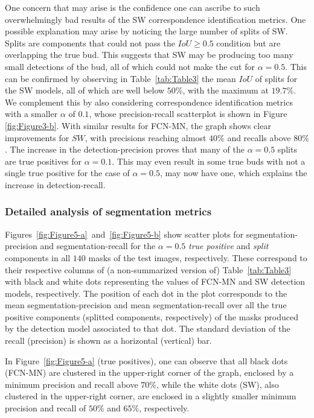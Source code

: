 \documentclass[a4paper,authoryear,review]{elsarticle}
\begin{document}
	One concern that may arise is the confidence one can ascribe to such overwhelmingly bad results of the SW correspondence identification metrics. One possible explanation may arise by noticing the large number of splits of SW. Splits are components that could not pass the $IoU \geq 0.5$ condition but are overlapping the true bud. This suggests that SW may be producing too many small detections of the bud, all of which could not make the cut for $\alpha=0.5$. This can be confirmed by observing in Table~\ref{tab:Table3} the mean $IoU$ of splits for the SW models, all of which are well below $50\%$, with the maximum at $19.7\%$. We complement this by also considering correspondence identification metrics with a smaller $\alpha$ of $0.1$, whose precision-recall scatterplot is  shown in Figure \ref{fig:Figure3-b}. With similar results for  FCN-MN, the graph shows clear improvements for $SW$, with precisions reaching almost $40\%$ and recalls above $80\%$. 
	The increase in the detection-precision proves that many of the $\alpha=0.5$ splits are true positives for $\alpha=0.1$. This may even result in some true buds with not a single true positive for the case of $\alpha=0.5$, may now have one, which explains  the increase in detection-recall.
	
	
	\subsubsection{Detailed analysis of segmentation metrics}
	
	Figures~\ref{fig:Figure5-a}~and~\ref{fig:Figure5-b} show scatter plots for segmentation-precision and segmentation-recall for the $\alpha=0.5$ \emph{true positive} and \emph{split} components in all $140$ masks of the test images, respectively. These correspond to their respective columns of (a non-summarized version of) Table~\ref{tab:Table3} with black and white dots representing the values of FCN-MN and SW detection models, respectively. The position of each dot in the plot corresponds to the mean segmentation-precision and mean segmentation-recall over all the true positive components (splitted components, respectively) of the masks produced by the detection model associated to that dot. The standard deviation of the recall (precision) is shown as a horizontal (vertical) bar.
	
	In Figure~\ref{fig:Figure5-a} (true positives), one can observe that all black dots (FCN-MN) are clustered in the upper-right corner of the graph, enclosed by a minimum precision and recall above $70\%$, while the white dots (SW), also clustered in the upper-right corner, are enclosed in a slightly smaller minimum precision and recall of $50\%$ and $65\%$, respectively. 
	
\end{document}
